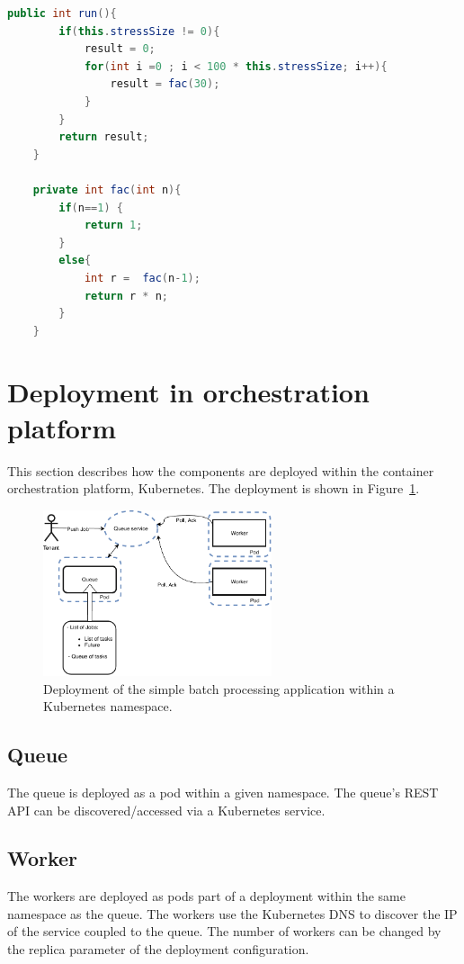 \begin{lstlisting}[caption=CPU stress test implementation., language=java, label={lst:cpustress}]
    public int run(){
        if(this.stressSize != 0){
            result = 0;
            for(int i =0 ; i < 100 * this.stressSize; i++){
                result = fac(30);
            }
        }
        return result;
    }

    private int fac(int n){
        if(n==1) {
            return 1;
        }
        else{
            int r =  fac(n-1);
            return r * n;
        }
    }
\end{lstlisting}

\section{Deployment in orchestration platform}
This section describes how the components are deployed within the container orchestration platform, Kubernetes. The deployment is shown in Figure~\ref{fig:queue2}.

\begin{figure}
    \centering
    \includegraphics[width=0.6\textwidth]{chapter-artificial-application/deployment_artificial.pdf}
    \caption{Deployment of the simple batch processing application within a Kubernetes namespace.}
    \label{fig:queue2}
\end{figure}
\subsection{Queue}
The queue is deployed as a pod within a given namespace. The queue's REST API can be discovered/accessed via a Kubernetes service. 
\subsection{Worker}
The workers are deployed as pods part of a deployment within the same namespace as the queue. The workers use the Kubernetes DNS to discover the IP of the service coupled to the queue. The number of workers can be changed by the replica parameter of the deployment configuration.




